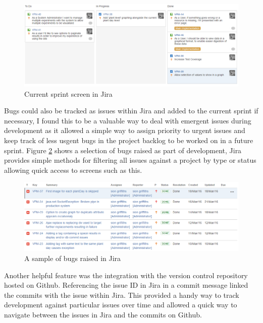 \begin{figure}[H]
    \centering
    \includegraphics[width=\textwidth]{images/tools/sprint1}
    \caption{Current sprint screen in Jira}
    \label{fig:jira_sprint}
\end{figure} 

 Bugs could also be tracked as issues within Jira and added to the current sprint if necessary, I found this to be a valuable way to deal with emergent issues during development as it allowed a simple way to assign priority to urgent issues and keep track of less usgent bugs in the project backlog to be worked on in a future sprint. Figure \ref{fig:jira_bugs} shows a selection of bugs raised as part of development, Jira provides simple methods for filtering all issues against a project by type or status allowing quick access to screens such as this.

\begin{figure}[H]
    \centering
    \includegraphics[width=\textwidth]{images/tools/jira_bugs}
    \caption{A sample of bugs raised in Jira}
    \label{fig:jira_bugs}
\end{figure} 

Another helpful feature was the integration with the version control repository hosted on Github. Referencing the issue ID in Jira in a commit message linked the commits with the issue within Jira. This provided a handy way to track development against particular issues over time and allowed a quick way to navigate between the issues in Jira and the commits on Github. 

